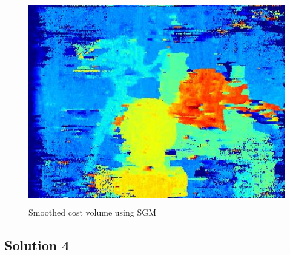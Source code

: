 \documentclass{article}
\newcommand{\solution}[1]{\clearpage \subsection*{Solution #1}}  %
\begin{document}
\begin{figure}[h!]
  \centering
	\includegraphics[height=24em]{code/outputs/prob3b.jpg}
	  \caption{Smoothed cost volume using SGM}
\end{figure}

\solution{4}
\end{document}
